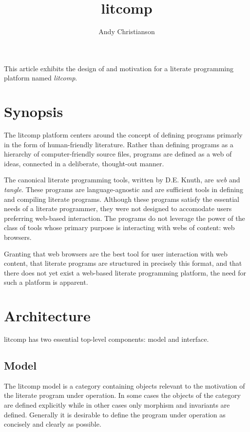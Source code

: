 \setlength{\topmargin}{-.5in}
\setlength{\textheight}{9in}
\setlength{\oddsidemargin}{.125in}
\setlength{\textwidth}{6.25in}

\title{litcomp}
\author{Andy Christianson}
\renewcommand{\today}{March 13, 2011}
\maketitle

This article exhibits the design of and motivation for a literate
programming platform named {\em litcomp}.

\section {Synopsis}

The litcomp platform centers around the concept of defining programs primarly
in the form of human-friendly literature. Rather than defining programs
as a hierarchy of computer-friendly source files, programs are defined
as a web of ideas, connected in a deliberate, thought-out manner.

The canonical literate programming tools, written by D.E. Knuth, are
{\em web} and {\em tangle}. These programs are language-agnostic and are
sufficient tools in defining and compiling literate programs. Although
these programs satisfy the essential needs of a literate programmer,
they were not designed to accomodate users preferring web-based
interaction. The programs do not leverage the power of the class of tools
whose primary purpose is interacting with webs of content: web browsers.

Granting that web browsers are the best tool for user interaction with
web content, that literate programs are structured in precisely this
format, and that there does not yet exist a web-based literate programming
platform, the need for such a platform is apparent.

\section {Architecture}

litcomp has two essential top-level components: model and interface.

\subsection {Model}

The litcomp model is a category containing objects relevant to
the motivation of the literate program under operation. In some cases
the objects of the category are defined explicitly while in other cases
only morphism and invariants are defined. Generally it is desirable to
define the program under operation as concisely and clearly as possible.

